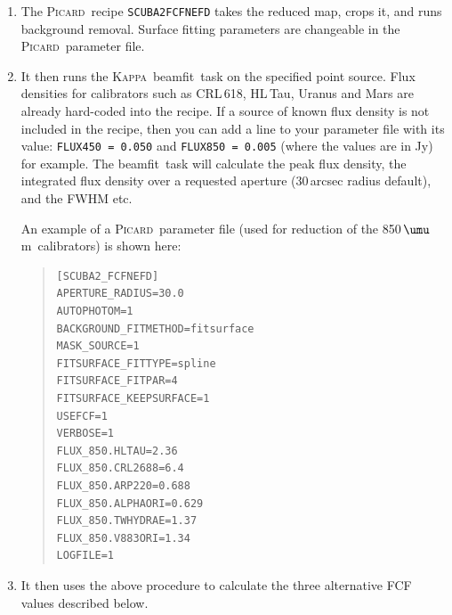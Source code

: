 \documentclass[twoside,11pt]{article}
\newcommand{\micron}{\mbox{\,${\umu}$m}}            %
\newcommand{\xref}[3]{#1}
\renewcommand{\_}{\texttt{\symbol{95}}}
\newenvironment{myquote}{\begin{quote}\begin{small}}{\end{small}\end{quote}}
\newcommand{\Kappa}{\xref{\textsc{Kappa}}{sun95}{}}
\newcommand{\picard}{\xref{\textsc{Picard}}{sun231}{}}
\newcommand{\drrecipe}[1]{\texttt{#1}}
\newcommand{\task}[1]{\textsf{#1}}
\newcommand{\beamfit}{\xref{\task{beamfit}}{sun95}{BEAMFIT}}
\begin{document}
\begin{enumerate}
\item{The \picard\ recipe \drrecipe{SCUBA2\_FCFNEFD} takes the reduced
  map, crops it, and runs background removal. Surface fitting
  parameters are changeable in the \picard\ parameter file.}
\item{It then runs the \Kappa\ \beamfit\ task on the specified point
  source. Flux densities for calibrators such as CRL\,618, HL\,Tau, Uranus
  and Mars are already hard-coded into the recipe. If a source of
  known flux density is not included in the recipe, then you can add a
  line to your parameter file with its value: \texttt{FLUX\_450 =
    0.050} and \texttt{FLUX\_850 = 0.005} (where the values are in Jy)
  for example. The \beamfit\ task will calculate the peak flux
  density, the integrated flux density over a requested aperture
  (30\,arcsec radius default), and the FWHM etc.}

  An example of a \picard\ parameter file (used for reduction of the
  850\micron\ calibrators) is shown here:

\begin{myquote}
\begin{verbatim}
[SCUBA2_FCFNEFD]
APERTURE_RADIUS=30.0
AUTOPHOTOM=1
BACKGROUND_FITMETHOD=fitsurface
MASK_SOURCE=1
FITSURFACE_FITTYPE=spline
FITSURFACE_FITPAR=4
FITSURFACE_KEEPSURFACE=1
USEFCF=1
VERBOSE=1
FLUX_850.HLTAU=2.36
FLUX_850.CRL2688=6.4
FLUX_850.ARP220=0.688
FLUX_850.ALPHAORI=0.629
FLUX_850.TWHYDRAE=1.37
FLUX_850.V883ORI=1.34
LOGFILE=1
\end{verbatim}
\end{myquote}

\item {It then uses the above procedure to calculate the three
  alternative FCF values described below.}
\end{enumerate}
\end{document}
